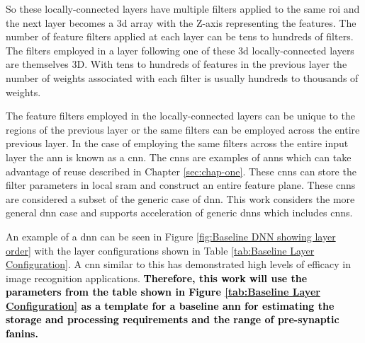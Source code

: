 
So these locally-connected layers have multiple filters applied to the same \ac{roi} and the next layer becomes a \ac{3d} array with the Z-axis representing the features. 
The number of feature filters applied at each layer can be tens to hundreds of filters.
The filters employed in a layer following one of these \ac{3d} locally-connected layers are themselves 3D. With tens to hundreds of features in the previous layer the number of weights associated with each filter is usually hundreds to thousands of weights. 

The feature filters employed in the locally-connected layers can be unique to the regions of the previous layer or the same filters can be employed across the entire previous layer.
In the case of employing the same filters across the entire input layer the \ac{ann} is known as a \acf{cnn}. The \acp{cnn} are examples of \acp{ann} which can take advantage of reuse described in Chapter \ref{sec:chap-one}. 
These \acp{cnn} can store the filter parameters in local \ac{sram} and construct an entire feature plane. These \acp{cnn} are considered a subset of the generic case of \ac{dnn}.
This work considers the more general \ac{dnn} case and supports acceleration of generic \acp{dnn} which includes \acp{cnn}.

An example of a \ac{dnn} can be seen in Figure \ref{fig:Baseline DNN showing layer order} with the layer configurations shown in Table \ref{tab:Baseline Layer Configuration}. A \ac{cnn} similar to this has demonstrated high levels of efficacy in image recognition applications.
{\textbf{\textcolor{black}{Therefore, this work will use the parameters from the table shown in Figure \ref{tab:Baseline Layer Configuration} as a template for a baseline \ac{ann} for estimating the storage and processing requirements and the range of pre-synaptic fanins.}}}

